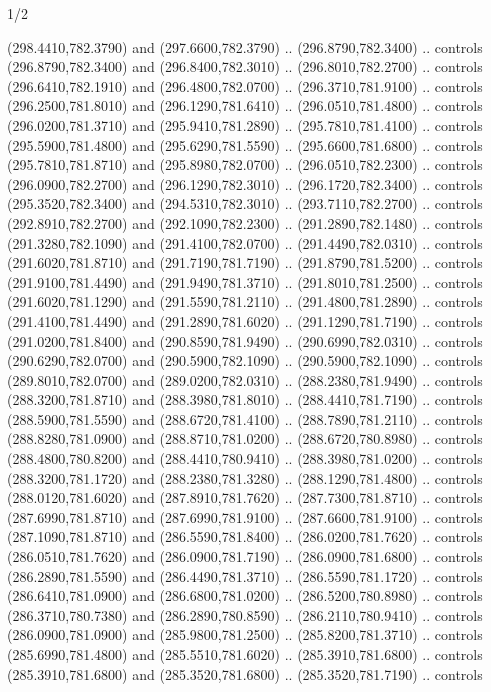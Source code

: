 \begin{flagdescription}{1/2}
\begin{scope}[xshift=0.5\flaglength]
\begin{scope}[scale=0.00745\flagwidth,xshift=-12.1mm,yshift=41.7mm]
\begin{scope}[y=0.80pt, x=0.80pt, yscale=-1, xscale=1, inner sep=0pt, outer sep=0pt]
\begin{scope}[cm={{1.33333,0.0,0.0,-1.33333,(0.0,114.66667)}}]
\begin{scope}[scale=0.100]
  (298.4410,782.3790) and (297.6600,782.3790) .. (296.8790,782.3400) .. controls
  (296.8790,782.3400) and (296.8400,782.3010) .. (296.8010,782.2700) .. controls
  (296.6410,782.1910) and (296.4800,782.0700) .. (296.3710,781.9100) .. controls
  (296.2500,781.8010) and (296.1290,781.6410) .. (296.0510,781.4800) .. controls
  (296.0200,781.3710) and (295.9410,781.2890) .. (295.7810,781.4100) .. controls
  (295.5900,781.4800) and (295.6290,781.5590) .. (295.6600,781.6800) .. controls
  (295.7810,781.8710) and (295.8980,782.0700) .. (296.0510,782.2300) .. controls
  (296.0900,782.2700) and (296.1290,782.3010) .. (296.1720,782.3400) .. controls
  (295.3520,782.3400) and (294.5310,782.3010) .. (293.7110,782.2700) .. controls
  (292.8910,782.2700) and (292.1090,782.2300) .. (291.2890,782.1480) .. controls
  (291.3280,782.1090) and (291.4100,782.0700) .. (291.4490,782.0310) .. controls
  (291.6020,781.8710) and (291.7190,781.7190) .. (291.8790,781.5200) .. controls
  (291.9100,781.4490) and (291.9490,781.3710) .. (291.8010,781.2500) .. controls
  (291.6020,781.1290) and (291.5590,781.2110) .. (291.4800,781.2890) .. controls
  (291.4100,781.4490) and (291.2890,781.6020) .. (291.1290,781.7190) .. controls
  (291.0200,781.8400) and (290.8590,781.9490) .. (290.6990,782.0310) .. controls
  (290.6290,782.0700) and (290.5900,782.1090) .. (290.5900,782.1090) .. controls
  (289.8010,782.0700) and (289.0200,782.0310) .. (288.2380,781.9490) .. controls
  (288.3200,781.8710) and (288.3980,781.8010) .. (288.4410,781.7190) .. controls
  (288.5900,781.5590) and (288.6720,781.4100) .. (288.7890,781.2110) .. controls
  (288.8280,781.0900) and (288.8710,781.0200) .. (288.6720,780.8980) .. controls
  (288.4800,780.8200) and (288.4410,780.9410) .. (288.3980,781.0200) .. controls
  (288.3200,781.1720) and (288.2380,781.3280) .. (288.1290,781.4800) .. controls
  (288.0120,781.6020) and (287.8910,781.7620) .. (287.7300,781.8710) .. controls
  (287.6990,781.8710) and (287.6990,781.9100) .. (287.6600,781.9100) .. controls
  (287.1090,781.8710) and (286.5590,781.8400) .. (286.0200,781.7620) .. controls
  (286.0510,781.7620) and (286.0900,781.7190) .. (286.0900,781.6800) .. controls
  (286.2890,781.5590) and (286.4490,781.3710) .. (286.5590,781.1720) .. controls
  (286.6410,781.0900) and (286.6800,781.0200) .. (286.5200,780.8980) .. controls
  (286.3710,780.7380) and (286.2890,780.8590) .. (286.2110,780.9410) .. controls
  (286.0900,781.0900) and (285.9800,781.2500) .. (285.8200,781.3710) .. controls
  (285.6990,781.4800) and (285.5510,781.6020) .. (285.3910,781.6800) .. controls
  (285.3910,781.6800) and (285.3520,781.6800) .. (285.3520,781.7190) .. controls

\end{scope}
\end{scope}
\end{scope}
\end{scope}
\end{scope}
\end{flagdescription}
